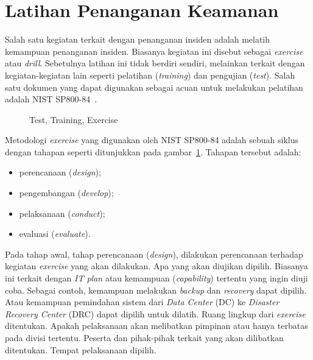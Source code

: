\section{Latihan Penanganan Keamanan}
Salah satu kegiatan terkait dengan penanganan insiden adalah melatih kemampuan
penanganan insiden. Biasanya kegiatan ini disebut sebagai {\em exercise} atau
{\em drill}. Sebetulnya latihan ini tidak berdiri sendiri, melainkan terkait
dengan kegiatan-kegiatan lain seperti pelatihan ({\em training}) dan pengujian
({\em test}).
Salah satu dokumen yang dapat digunakan sebagai acuan untuk melakukan pelatihan
adalah NIST SP800-84~\cite{sp800-84}.

\begin{figure}[ht]
\caption{Test, Training, Exercise}
\label{fig:tte}
\end{figure}


Metodologi {\em exercise} yang digunakan oleh NIST SP800-84 adalah sebuah siklus 
dengan tahapan seperti ditunjukkan pada gambar~\ref{fig:tte}. Tahapan tersebut
adalah:
\begin{itemize}
   \item perencanaan ({\em design});
   \item pengembangan ({\em develop});
   \item pelaksanaan ({\em conduct});
   \item evaluasi ({\em evaluate}).
\end{itemize}
Pada tahap awal, tahap perencanaan ({\em design}), dilakukan perencanaan terhadap 
kegiatan {\em exercise} yang akan dilakukan. Apa yang akan diujikan dipilih.
Biasanya ini terkait dengan {\em IT plan} atau kemampuan ({\em capability})
tertentu yang ingin diuji coba. Sebagai contoh, kemampuan melakukan {\em
backup} dan {\em recovery} dapat dipilih. Atau kemampuan pemindahan sistem dari
{\em Data Center} (DC) ke {\em Disaster Recovery Center} (DRC) dapat dipilih
untuk dilatih.
Ruang lingkup dari {\em exercise} ditentukan. Apakah pelaksanaan akan
melibatkan pimpinan atau hanya terbatas pada divisi tertentu.
Peserta dan pihak-pihak terkait yang akan dilibatkan ditentukan.
Tempat pelaksanaan dipilih.

